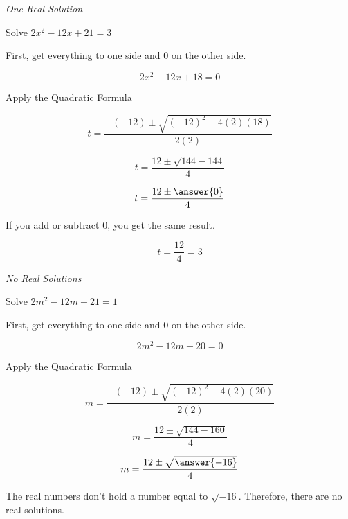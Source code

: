\documentclass{ximera}
\begin{document}
\begin{example} \textit{One Real Solution}

Solve $2 x^2 - 12x + 21 = 3$ \\

\begin{explanation}

First, get everything to one side and $0$ on the other side.



\[  2 x^2 - 12x + 18 = 0  \]

Apply the Quadratic Formula


\[   t = \frac{-(-12) \pm \sqrt{(-12)^2 - 4 (2) (18)}}{2 (2)}            \]



\[   t = \frac{12 \pm \sqrt{144 - 144}}{4}            \]

\[   t = \frac{12 \pm \answer{0}}{4}            \]

If you add or subtract $0$, you get the same result.

\[   t = \frac{12}{4}   = 3         \]




\end{explanation}


\end{example}








\begin{example} \textit{No Real Solutions}

Solve $2 m^2 - 12m + 21 = 1$ \\

\begin{explanation}

First, get everything to one side and $0$ on the other side.



\[  2 m^2 - 12m + 20 = 0  \]

Apply the Quadratic Formula


\[   m = \frac{-(-12) \pm \sqrt{(-12)^2 - 4 (2) (20)}}{2 (2)}            \]

\[   m = \frac{12 \pm \sqrt{144 - 160}}{4}            \]

\[   m = \frac{12 \pm \sqrt{\answer{-16}}}{4}            \]



The real numbers don't hold a number equal to $\sqrt{-16}$.  Therefore, there are no real solutions.



\end{explanation}

\end{example}
\end{document}
